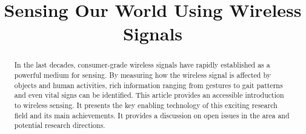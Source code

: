\documentclass[conference]{IEEEtran}
\begin{document}
%
\title{Sensing Our World Using Wireless Signals}


\author{}

\maketitle

\begin{abstract}
In the last decades, consumer-grade wireless signals have rapidly established as a powerful medium for sensing. By measuring how the
wireless signal is affected by objects and human activities, rich information ranging from gestures to gait patterns and even vital
 signs can be identified. This article provides an accessible introduction to wireless sensing. It presents the key enabling technology of
this exciting research field and its main achievements. It provides a discussion on open issues in the area and potential research
directions.
\end{abstract}


\IEEEpeerreviewmaketitle










\footnotesize


\end{document}
